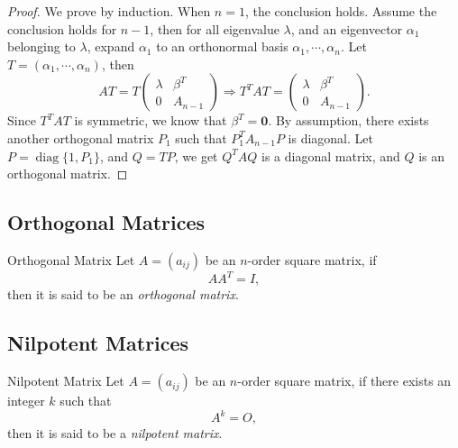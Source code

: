 \begin{proof}
  We prove by induction.
  When $n = 1$, the conclusion holds.
  Assume the conclusion holds for $n - 1$,
  then for all eigenvalue $\lambda$, and an eigenvector $\alpha_1$ belonging to
  $\lambda$, expand $\alpha_1$ to an orthonormal basis
  $\alpha_1,\cdots,\alpha_n$.
  Let $T = (\alpha_1,\cdots,\alpha_n)$, then
  \begin{equation}
    AT = T \left(
      \begin{array}{cc}
        \lambda&\beta^T\\
        0&A_{n-1}
      \end{array}
    \right) \Rightarrow T^T AT = \left(
      \begin{array}{cc}
        \lambda&\beta^T \\
               0&A_{n-1}
      \end{array}
    \right).
  \end{equation}
  Since $T^TAT$ is symmetric, we know that $\beta^T = \mathbf{0}$.
  By assumption, there exists another orthogonal matrix $P_1$ such that
  $P_1^TA_{n-1}P$ is diagonal. Let $P = \operatorname{diag}\{1, P_1\}$,
  and $Q = TP$, we get $Q^TAQ$ is a diagonal matrix, and $Q$ is an orthogonal matrix.
\end{proof}

\subsection{Orthogonal Matrices}

\begin{definition}{Orthogonal Matrix}{}
  Let $A = (a_{ij})$ be an $n$-order square matrix, if 
  \begin{equation}
    AA^T = I,
  \end{equation}
  then it is said to be an \emph{orthogonal matrix}.
\end{definition}

\subsection{Nilpotent Matrices}

\begin{definition}{Nilpotent Matrix}{}
  Let $A = (a_{ij})$ be an $n$-order square matrix, if
  there exists an integer $k$ such that
  \begin{equation}
    A^k = O,
  \end{equation}
  then it is said to be a \emph{nilpotent matrix}.
\end{definition}

